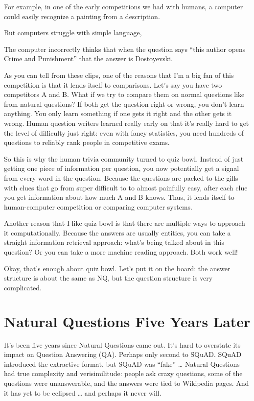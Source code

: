 For example, in one of the early competitions we had with humans, a computer could easily recognize a painting from a description. 

But computers struggle with simple language, 

The computer incorrectly thinks that when the question says “this author opens Crime and Punishment” that the answer is Dostoyevski.

As you can tell from these clips, one of the reasons that I’m a big fan of this competition is that it lends itself to comparisons. Let’s say you have two competitors A and B. What if we try to compare them on normal questions like from natural questions? If both get the question right or wrong, you don’t learn anything. You only learn something if one gets it right and the other gets it wrong. Human question writers learned really early on that it’s really hard to get the level of difficulty just right: even with fancy statistics, you need hundreds of questions to reliably rank people in competitive exams.

So this is why the human trivia community turned to quiz bowl. Instead of just getting one piece of information per question, you now potentially get a signal from every word in the question. Because the questions are packed to the gills with clues that go from super difficult to to almost painfully easy, after each clue you get information about how much A and B knows. Thus, it lends itself to human-computer competition or comparing computer systems.

Another reason that I like quiz bowl is that there are multiple ways to approach it computationally. Because the answers are usually entities, you can take a straight information retrieval approach: what’s being talked about in this question? Or you can take a more machine reading approach. Both work well!

Okay, that’s enough about quiz bowl. Let’s put it on the board: the answer structure is about the same as NQ, but the question structure is very complicated.


\section{Natural Questions Five Years Later}
\label{sec:nq:problems}

It’s been five years since Natural Questions came out.  It’s hard to overstate its impact on Question Answering (QA).  Perhaps only second to SQuAD.  SQuAD introduced the extractive format, but SQuAD was “fake” … Natural Questions had true complexity and verisimilitude: people ask crazy questions, some of the questions were unanswerable, and the answers were tied to Wikipedia pages.  And it has yet to be eclipsed … and perhaps it never will.  


